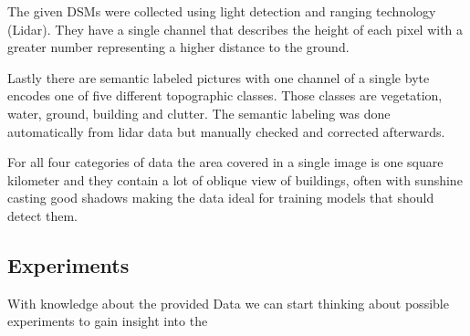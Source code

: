 The given DSMs were collected using light detection and ranging technology (Lidar). 
They have a single channel that describes the height of each pixel with a greater number 
representing a higher distance to the ground. 

Lastly there are semantic labeled pictures with one channel of a single byte encodes one of five 
different topographic classes. Those classes are vegetation, water, ground, building and clutter. 
The semantic labeling was done automatically from lidar data but manually checked and corrected afterwards.

For all four categories of data the area covered in a single image
is one square kilometer and they contain a lot of oblique view of 
buildings, often with sunshine casting good shadows making the 
data ideal for training models that should detect them.

\subsection{Experiments}

With knowledge about the provided Data we can start thinking about possible experiments to
gain insight into the 